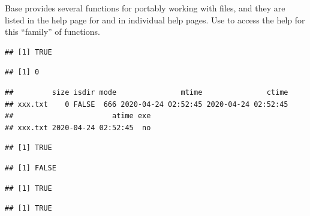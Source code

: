 \documentclass[krantz2]{krantz}\usepackage{knitr}
\begin{document}
Base \Rlang provides several functions for portably working with files, and they are listed in the help page for  and in individual help pages. Use  to access the help for this ``family'' of functions.

\begin{knitrout}\footnotesize
{}\color{fgcolor}\begin{kframe}
\begin{alltt}
 \hlstd{(}\hlopt{!}\hlstd{(}\hlstd{)) \{}
  \hlstd{(}\hlstd{)}
\hlstd{\}}
\end{alltt}
\begin{verbatim}
## [1] TRUE
\end{verbatim}
\begin{alltt}
\hlstd{(}\hlstd{)}
\end{alltt}
\begin{verbatim}
## [1] 0
\end{verbatim}
\begin{alltt}
\hlstd{(}\hlstd{)}
\end{alltt}
\begin{verbatim}
##         size isdir mode               mtime               ctime
## xxx.txt    0 FALSE  666 2020-04-24 02:52:45 2020-04-24 02:52:45
##                       atime exe
## xxx.txt 2020-04-24 02:52:45  no
\end{verbatim}
\begin{alltt}
\hlstd{(}\hlstd{,} \hlstd{)}
\end{alltt}
\begin{verbatim}
## [1] TRUE
\end{verbatim}
\begin{alltt}
\hlstd{(}\hlstd{)}
\end{alltt}
\begin{verbatim}
## [1] FALSE
\end{verbatim}
\begin{alltt}
\hlstd{(}\hlstd{)}
\end{alltt}
\begin{verbatim}
## [1] TRUE
\end{verbatim}
\begin{alltt}
\hlstd{(}\hlstd{)}
\end{alltt}
\begin{verbatim}
## [1] TRUE
\end{verbatim}
\end{kframe}
\end{knitrout}
\end{document}
